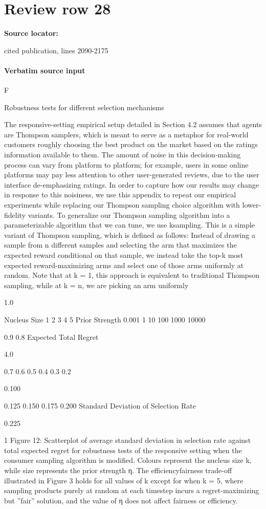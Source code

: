 \documentclass[10pt]{article}
\begin{document}
\section*{Review row 28}
\textbf{Source locator:} {\footnotesize\raggedright cited publication, lines 2090-\allowbreak{}2175\par}
\paragraph{Verbatim source input}
\begin{ReviewVerbatim}
F

Robustness tests for different selection
mechanisms

The responsive-setting empirical setup detailed in Section
4.2 assumes that agents are Thompson samplers, which
is meant to serve as a metaphor for real-world customers
roughly choosing the best product on the market based on
the ratings information available to them. The amount of
noise in this decision-making process can vary from platform to platform; for example, users in some online platforms may pay less attention to other user-generated reviews, due to the user interface de-emphasizing ratings. In
order to capture how our results may change in response to
this noisiness, we use this appendix to repeat our empirical
experiments while replacing our Thompson sampling choice
algorithm with lower-fidelity variants.
To generalize our Thompson sampling algorithm into
a parameterizable algorithm that we can tune, we use ksampling. This is a simple variant of Thompson sampling,
which is defined as follows: Instead of drawing a sample
from n different samples and selecting the arm that maximizes the expected reward conditional on that sample, we instead take the top-k most expected reward-maximizing arms
and select one of those arms uniformly at random. Note that
at k = 1, this approach is equivalent to traditional Thompson
sampling, while at k = n, we are picking an arm uniformly

1.0

Nucleus Size
1
2
3
4
5
Prior Strength
0.001
1
10
100
1000
10000

0.9
0.8
Expected Total Regret

4.0

0.7
0.6
0.5
0.4
0.3
0.2

0.100

0.125
0.150
0.175
0.200
Standard Deviation of Selection Rate

0.225

1
Figure 12: Scatterplot of average
standard deviation in selection rate against total expected regret for robustness tests
of the responsive setting when the consumer sampling algorithm is modified. Colours represent the nucleus size k,
while size represents the prior strength η. The efficiencyfairness trade-off illustrated in Figure 3 holds for all values
of k except for when k = 5, where sampling products purely
at random at each timestep incurs a regret-maximizing but
”fair” solution, and the value of η does not affect fairness or
efficiency.


\end{ReviewVerbatim}
\end{document}
